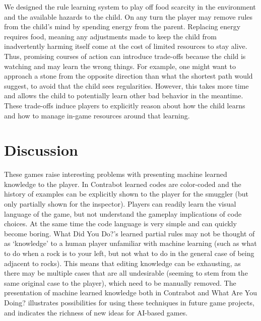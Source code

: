 \documentclass{sig-alternate}
\begin{document}
We designed the rule learning system to play off food scarcity in the environment and the available hazards to the child.
On any turn the player may remove rules from the child's mind by spending energy from the parent.
Replacing energy requires food, meaning any adjustments made to keep the child from inadvertently harming itself come at the cost of limited resources to stay alive.
Thus, promising courses of action can introduce trade-offs because the child is watching and may learn the wrong things.
For example, one might want to approach a stone from the opposite direction than what the shortest path would suggest, to avoid that the child sees regularities.
However, this takes more time and allows the child to potentially learn other bad behavior in the meantime.
These trade-offs induce players to explicitly reason about how the child learns and how to manage in-game resources around that learning.

\section{Discussion}
These games raise interesting problems with presenting machine learned knowledge to the player.
In {\sc Contrabot} learned codes are color-coded and the history of examples can be explicitly shown to the player for the smuggler (but only partially shown for the inspector).
Players can readily learn the visual language of the game, but not understand the gameplay implications of code choices.
At the same time the code language is very simple and can quickly become boring.
{\sc What Did You Do?}'s learned partial rules may not be thought of as `knowledge' to a human player unfamiliar with machine learning (such as what to do when a rock is to your left, but not what to do in the general case of being adjacent to rocks).
This means that editing knowledge can be exhausting, as there may be multiple cases that are all undesirable (seeming to stem from the same original case to the player), which need to be manually removed.
%
The presentation of machine learned knowledge both in {\sc Contrabot} and {\sc What Are You Doing?} illustrates possibilities for using these techniques in future game projects, and indicates the richness of new ideas for AI-based games.




\end{document}

